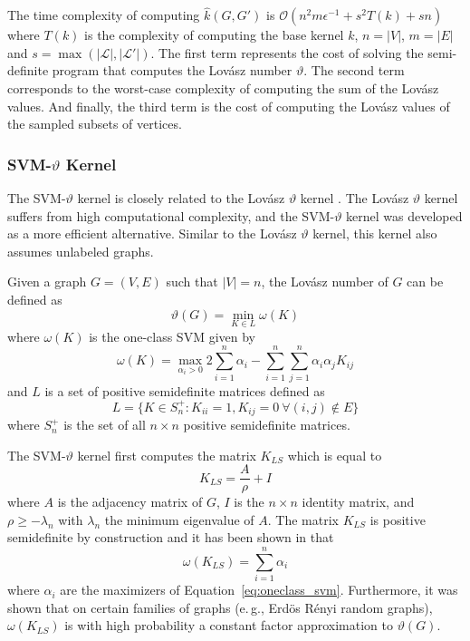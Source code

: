 \documentclass[twoside,11pt]{article}
\newcommand{\eg}{e.\,g., }
\begin{document}
The time complexity of computing $\hat{k}(G, G')$ is $\mathcal{O}(n^2 m \epsilon^{-1} + s^2 T(k) + sn)$ where $T(k)$ is the complexity of computing the base kernel $k$, $n = |V|$, $m = |E|$ and $s = \max(|\mathcal{L}|, |\mathcal{L}'|)$.
The first term represents the cost of solving the semi-definite program that computes the Lov\'asz number $\vartheta$.
The second term corresponds to the worst-case complexity of computing the sum of the Lov\'asz values.
And finally, the third term is the cost of computing the Lov\'asz values of the sampled subsets of vertices.


\subsubsection{SVM-$\vartheta$ Kernel}
The SVM-$\vartheta$ kernel is closely related to the Lov\'asz $\vartheta$ kernel .
The Lov\'asz $\vartheta$ kernel suffers from high computational complexity, and the SVM-$\vartheta$ kernel was developed as a more efficient alternative. 
Similar to the Lov\'asz $\vartheta$ kernel, this kernel also assumes unlabeled graphs.

Given a graph $G=(V,E)$ such that $|V| = n$, the Lov\'asz number of $G$ can be defined as
\begin{equation}
    \vartheta(G) = \min_{K \in L} \omega(K)
\end{equation}
where $\omega(K)$ is the one-class SVM given by
\begin{equation}
    \label{eq:oneclass_svm}
    \omega(K) = \max_{\alpha_i > 0} 2\sum_{i=1}^{n} \alpha_i - \sum_{i=1}^{n} \sum_{j=1}^{n} \alpha_i \alpha_j K_{ij}
\end{equation}
and $L$ is a set of positive semidefinite matrices defined as
\begin{equation}
    L = \{ K \in S_{n}^+ : K_{ii} = 1, K_{ij}=0 \: \forall (i,j) \not \in E \}
\end{equation}
where $S_{n}^+$ is the set of all $n \times n$ positive semidefinite matrices.

The SVM-$\vartheta$ kernel first computes the matrix $K_{LS}$ which is equal to
\begin{equation}
    K_{LS} = \frac{A}{\rho} + I
\end{equation}
where $A$ is the adjacency matrix of $G$, $I$ is the $n \times n$ identity matrix, and $\rho \geq -\lambda_n$ with $\lambda_n$ the minimum eigenvalue of $A$.
The matrix $K_{LS}$ is positive semidefinite by construction and it has been shown in  that
\begin{equation}
    \omega(K_{LS}) = \sum_{i=1}^n \alpha_i
\end{equation}
where $\alpha_i$ are the maximizers of Equation~\eqref{eq:oneclass_svm}. 
Furthermore, it was shown that on certain families of graphs (\eg Erd{\"o}s R{\'e}nyi random graphs), $\omega(K_{LS})$ is with high probability a constant factor approximation to $\vartheta(G)$.
\end{document}
